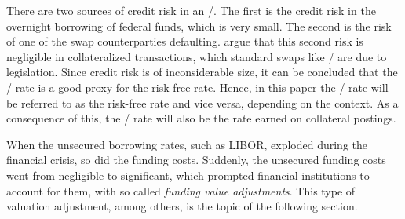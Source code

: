 \documentclass[main.tex]{subfiles}
\begin{document}
    There are two sources of credit risk in an \OIS/.
    The first is the credit risk in the overnight borrowing of federal funds, which is very small. 
    The second is the risk of one of the swap counterparties defaulting.
    \textcite{HullWhiteOISvsLIBOR}
    argue that this second risk is negligible in collateralized transactions,
    which standard swaps like \OIS/ are due to legislation.
    Since credit risk is of inconsiderable size, it can be concluded 
    that the \OIS/ rate is a good proxy for the risk-free rate.
    Hence, in this paper the \OIS/ rate will be referred to as the risk-free rate
    and vice versa, depending on the context.
    As a consequence of this, the \OIS/ rate will also be the rate earned on collateral postings.

    When the unsecured borrowing rates, such as LIBOR, exploded during the financial crisis, 
    so did the funding costs. 
    Suddenly, the unsecured funding costs went from negligible to significant,
    which prompted financial institutions to account for them, 
    with so called \textit{funding value adjustments}. 
    This type of valuation adjustment, among others, is the topic of the following section.
\end{document}
